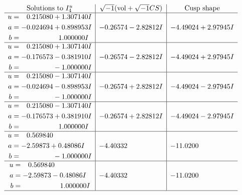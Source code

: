 \documentclass[1p]{elsarticle_modified}
\theoremstyle{definition}
\newcommand{\I}{\sqrt{-1}}
\begin{document}
$$\begin{array}{c|c|c}  
\text{Solutions to }I^u_{4}& \I (\text{vol} + \sqrt{-1}CS) & \text{Cusp shape}\\
 \hline 
\begin{aligned}
u &= \phantom{-}0.215080 + 1.307140 I \\
a &= -0.024694 + 0.898953 I \\
b &= \phantom{-0.000000 -}1.000000 I\end{aligned}
 & -0.26574 - 2.82812 I & -4.49024 + 2.97945 I \\ \hline\begin{aligned}
u &= \phantom{-}0.215080 + 1.307140 I \\
a &= -0.176573 - 0.381910 I \\
b &= \phantom{-0.000000 } -1.000000 I\end{aligned}
 & -0.26574 - 2.82812 I & -4.49024 + 2.97945 I \\ \hline\begin{aligned}
u &= \phantom{-}0.215080 - 1.307140 I \\
a &= -0.024694 - 0.898953 I \\
b &= \phantom{-0.000000 } -1.000000 I\end{aligned}
 & -0.26574 + 2.82812 I & -4.49024 - 2.97945 I \\ \hline\begin{aligned}
u &= \phantom{-}0.215080 - 1.307140 I \\
a &= -0.176573 + 0.381910 I \\
b &= \phantom{-0.000000 -}1.000000 I\end{aligned}
 & -0.26574 + 2.82812 I & -4.49024 - 2.97945 I \\ \hline\begin{aligned}
u &= \phantom{-}0.569840\phantom{ +0.000000I} \\
a &= -2.59873 + 0.48086 I \\
b &= \phantom{-0.000000 } -1.000000 I\end{aligned}
 & -4.40332\phantom{ +0.000000I} & -11.0200\phantom{ +0.000000I} \\ \hline\begin{aligned}
u &= \phantom{-}0.569840\phantom{ +0.000000I} \\
a &= -2.59873 - 0.48086 I \\
b &= \phantom{-0.000000 -}1.000000 I\end{aligned}
 & -4.40332\phantom{ +0.000000I} & -11.0200\phantom{ +0.000000I}\\
 \hline 
 \end{array}$$\newpage\newpage\renewcommand{\arraystretch}{1}
\end{document}

